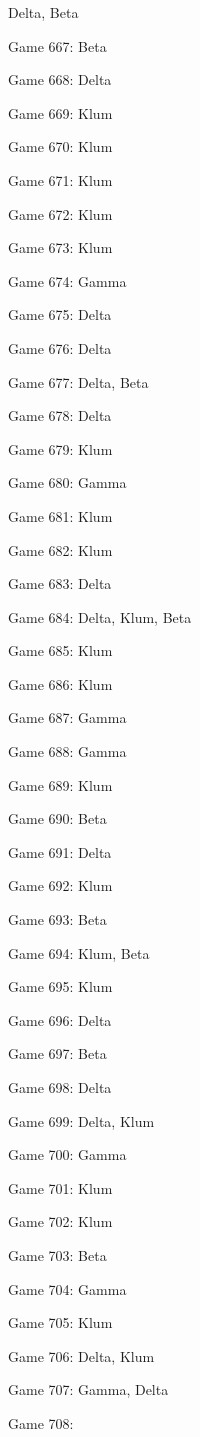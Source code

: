 \documentclass{article}
\begin{document}
\begin{multicols}{3}
\begin{compactitem}
Delta, Beta
\item Game 667:
Beta
\item Game 668:
Delta
\item Game 669:
Klum
\item Game 670:
Klum
\item Game 671:
Klum
\item Game 672:
Klum
\item Game 673:
Klum
\item Game 674:
Gamma
\item Game 675:
Delta
\item Game 676:
Delta
\item Game 677:
Delta, Beta
\item Game 678:
Delta
\item Game 679:
Klum
\item Game 680:
Gamma
\item Game 681:
Klum
\item Game 682:
Klum
\item Game 683:
Delta
\item Game 684:
Delta, Klum, Beta
\item Game 685:
Klum
\item Game 686:
Klum
\item Game 687:
Gamma
\item Game 688:
Gamma
\item Game 689:
Klum
\item Game 690:
Beta
\item Game 691:
Delta
\item Game 692:
Klum
\item Game 693:
Beta
\item Game 694:
Klum, Beta
\item Game 695:
Klum
\item Game 696:
Delta
\item Game 697:
Beta
\item Game 698:
Delta
\item Game 699:
Delta, Klum
\item Game 700:
Gamma
\item Game 701:
Klum
\item Game 702:
Klum
\item Game 703:
Beta
\item Game 704:
Gamma
\item Game 705:
Klum
\item Game 706:
Delta, Klum
\item Game 707:
Gamma, Delta
\item Game 708:

\end{compactitem}
\end{multicols}
\end{document}
